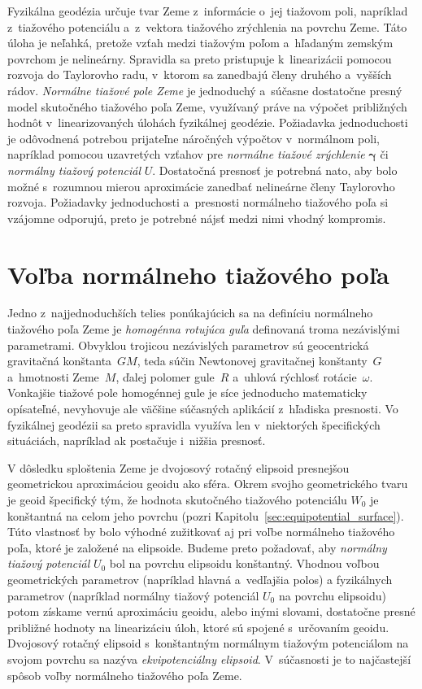 \documentclass[a4paper,12pt]{book}
\begin{document}
Fyzikálna geodézia určuje tvar Zeme z~informácie o~jej tiažovom poli, napríklad 
z~tiažového potenciálu a~z~vektora tiažového zrýchlenia na povrchu Zeme.  Táto 
úloha je neľahká, pretože vzťah medzi tiažovým poľom a~hľadaným zemským 
povrchom je nelineárny.  Spravidla sa preto pristupuje k~linearizácii pomocou 
rozvoja do Taylorovho radu, v~ktorom sa zanedbajú členy druhého a~vyšších 
rádov.  \emph{Normálne tiažové pole Zeme} je jednoduchý a~súčasne dostatočne 
presný model skutočného tiažového poľa Zeme, využívaný práve na výpočet 
približných hodnôt v~linearizovaných úlohách fyzikálnej geodézie.  Požiadavka 
jednoduchosti je odôvodnená potrebou prijateľne náročných výpočtov v~normálnom 
poli, napríklad pomocou uzavretých vzťahov pre \emph{normálne tiažové 
zrýchlenie} $\boldsymbol{\gamma}$ či \emph{normálny tiažový potenciál} $U$.  
Dostatočná presnosť je potrebná nato, aby bolo možné s~rozumnou mierou 
aproximácie zanedbať nelineárne členy Taylorovho rozvoja.  Požiadavky 
jednoduchosti a~presnosti normálneho tiažového poľa si vzájomne odporujú, preto 
je potrebné nájsť medzi nimi vhodný kompromis.

\section{Voľba normálneho tiažového poľa}
\label{sec:choice_of_normal_gravity_field}

Jedno z~najjednoduchších telies ponúkajúcich sa na definíciu normálneho 
tiažového poľa Zeme je \emph{homogénna rotujúca guľa} definovaná troma 
nezávislými parametrami.  Obvyklou trojicou nezávislých parametrov sú 
geocentrická gravitačná konštanta~$GM$, teda súčin Newtonovej gravitačnej 
konštanty~$G$ a~hmotnosti Zeme~$M$, ďalej polomer gule~$R$ a~uhlová rýchlosť 
rotácie~$\omega$.  Vonkajšie tiažové pole homogénnej gule je síce jednoducho 
matematicky opísateľné, nevyhovuje ale väčšine súčasných aplikácií z~hľadiska 
presnosti.  Vo fyzikálnej geodézii sa preto spravidla využíva len v~niektorých 
špecifických situáciách, napríklad ak postačuje i~nižšia presnosť.

V dôsledku sploštenia Zeme je dvojosový rotačný elipsoid presnejšou 
geometrickou aproximáciou geoidu ako sféra.  Okrem svojho geometrického tvaru 
je geoid špecifický tým, že hodnota skutočného tiažového potenciálu $W_0$ je 
konštantná na celom jeho povrchu (pozri 
Kapitolu~\ref{sec:equipotential_surface}).  Túto vlastnosť by bolo výhodné 
zužitkovať aj pri voľbe normálneho tiažového poľa, ktoré je založené na 
elipsoide.  Budeme preto požadovať, aby \emph{normálny tiažový potenciál} $U_0$ 
bol na povrchu elipsoidu konštantný.  Vhodnou voľbou geometrických parametrov 
(napríklad hlavná a~vedľajšia polos) a fyzikálnych parametrov (napríklad 
normálny tiažový potenciál $U_0$ na povrchu elipsoidu) potom získame vernú 
aproximáciu geoidu, alebo inými slovami, dostatočne presné približné hodnoty na 
linearizáciu úloh, ktoré sú spojené s~určovaním geoidu.  Dvojosový rotačný 
elipsoid s~konštantným normálnym tiažovým potenciálom na svojom povrchu sa 
nazýva \emph{ekvipotenciálny elipsoid}.  V~súčasnosti je to najčastejší spôsob 
voľby normálneho tiažového poľa Zeme.
\end{document}
